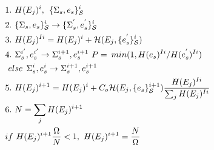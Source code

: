 \documentclass[aps,prl,reprint,superscriptaddress,showkeys]{revtex4-1}
\begin{document}
\begin{equation}
\begin{split}
&1.\hspace{0.125cm} H(E_j)^i ,\hspace{0.15cm}  \{\Sigma_{s},e_s\}_{\mathcal{S}}^i\\
&2. \hspace{0.125cm}\{\Sigma_{s},e_s\}_{\mathcal{S}}^i \rightarrow  \{\Sigma_{s}^{'},e_s^{'}\}_{\mathcal{S}}^i\\
&3. \hspace{0.125cm}H(E_j)^{Ii} = H(E_j)^i + \mathcal{H}(E_j, \{e_{s}^{'}\}_{\mathcal{S}}^i) \\
&4. \hspace{0.125cm} \Sigma_{s}^{i'}, e_s^{i'} \rightarrow \Sigma_{s}^{i+1},e_s^{i+1}   \hspace{0.125cm} P = \hspace{0.075cm} min (1, H(e_s)^{Ii}/H(e_s^{'})^{Ii})\\
& \hspace{0.125cm}else  \hspace{0.15cm} \Sigma_{s}^i, e_s^i \rightarrow \Sigma_{s}^{i+1}, e_s^{i+1}\\
&5. \hspace{0.125cm} H(E_j)^{i+1} = H(E_j)^{i} + C_o\mathcal{H}(E_j, \{e_s\}_{\mathcal{S}}^{i+1})\frac{H(E_j)^{Ii}}{\sum_j H(E_j)^{Ii} }\\
&6. \hspace{0.125cm} N = \sum_j H(E_j)^{i+1} \hspace{0.125cm}\\
& if \hspace{0.125cm} H(E_j)^{i+1}\frac{\Omega}{N}  < 1, \hspace{0.125cm}  H(E_j)^{i+1} =  \frac{N}{\Omega}
\end{split}
\end{equation}
\end{document}
